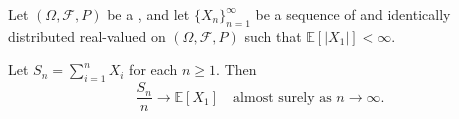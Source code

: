 \begin{theorem} \label{theorem:strong_law_of_large_numbers}
Let $(\Omega, \mathcal{F}, P)$ be a , and let $\{X_n\}_{n=1}^\infty$ be a sequence of  and identically distributed real-valued  on $(\Omega, \mathcal{F}, P)$ such that $\mathbb{E}[|X_1|] < \infty$.

Let $S_n = \sum_{i=1}^n X_i$ for each $n \geq 1$. Then
$$\frac{S_n}{n} \to \mathbb{E}[X_1] \quad \text{almost surely as } n \to \infty.$$
\end{theorem}
